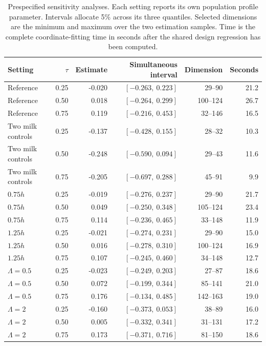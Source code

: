 \begin{table}[p]
\centering
\small
\caption{Prespecified sensitivity analyses. Each setting reports its own population profile parameter. Intervals allocate 5\% across its three quantiles. Selected dimensions are the minimum and maximum over the two estimation samples. Time is the complete coordinate-fitting time in seconds after the shared design regression has been computed.}
\label{tab:milk-sensitivity}
\begin{tabular}{lrrrrr}
\toprule
Setting & $\tau$ & Estimate & Simultaneous interval & Dimension & Seconds \\
\midrule
Reference & 0.25 & -0.020 & $[-0.263,\ 0.223]$ & 29--90 & 21.2 \\
Reference & 0.50 & 0.018 & $[-0.264,\ 0.299]$ & 100--124 & 26.7 \\
Reference & 0.75 & 0.119 & $[-0.216,\ 0.453]$ & 32--146 & 16.5 \\
Two milk controls & 0.25 & -0.137 & $[-0.428,\ 0.155]$ & 28--32 & 10.3 \\
Two milk controls & 0.50 & -0.248 & $[-0.590,\ 0.094]$ & 29--43 & 11.6 \\
Two milk controls & 0.75 & -0.205 & $[-0.697,\ 0.288]$ & 45--91 & 9.9 \\
$0.75h$ & 0.25 & -0.019 & $[-0.276,\ 0.237]$ & 29--90 & 21.7 \\
$0.75h$ & 0.50 & 0.049 & $[-0.250,\ 0.348]$ & 105--124 & 23.4 \\
$0.75h$ & 0.75 & 0.114 & $[-0.236,\ 0.465]$ & 33--148 & 11.9 \\
$1.25h$ & 0.25 & -0.021 & $[-0.274,\ 0.231]$ & 29--90 & 15.0 \\
$1.25h$ & 0.50 & 0.016 & $[-0.278,\ 0.310]$ & 100--124 & 16.9 \\
$1.25h$ & 0.75 & 0.107 & $[-0.245,\ 0.460]$ & 34--148 & 12.7 \\
$\Lambda=0.5$ & 0.25 & -0.023 & $[-0.249,\ 0.203]$ & 27--87 & 18.6 \\
$\Lambda=0.5$ & 0.50 & 0.072 & $[-0.199,\ 0.344]$ & 85--141 & 21.0 \\
$\Lambda=0.5$ & 0.75 & 0.176 & $[-0.134,\ 0.485]$ & 142--163 & 19.0 \\
$\Lambda=2$ & 0.25 & -0.160 & $[-0.373,\ 0.053]$ & 38--89 & 16.0 \\
$\Lambda=2$ & 0.50 & 0.005 & $[-0.332,\ 0.341]$ & 31--131 & 17.2 \\
$\Lambda=2$ & 0.75 & 0.173 & $[-0.371,\ 0.716]$ & 81--150 & 18.6 \\
\bottomrule
\end{tabular}
\end{table}
